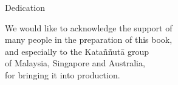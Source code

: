 
\vspace*{4\baselineskip}

{\centering

\begin{minipage}{0.9\linewidth}
\centering\small
Dedication

We would like to acknowledge the support of\\
many people in the preparation of this book,\\
and especially to the Kata\~n\~nut\=a group\\
of Malaysia, Singapore and Australia,\\
for bringing it into production.

\end{minipage}

}
